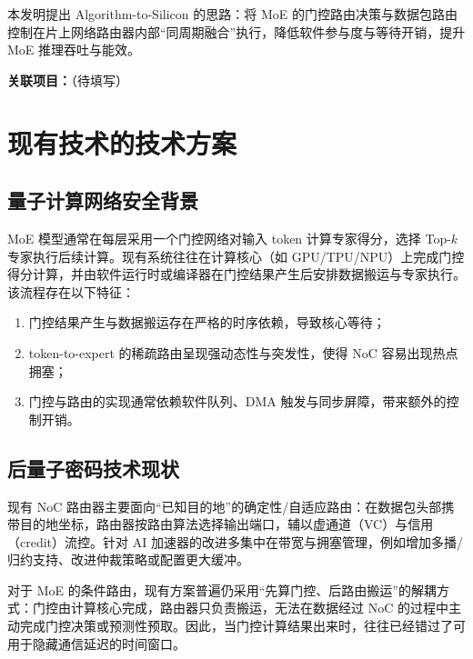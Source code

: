 \documentclass[12pt,a4paper]{article}
\begin{document}
本发明提出 Algorithm-to-Silicon 的思路：将 MoE 的门控路由决策与数据包路由控制在片上网络路由器内部“同周期融合”执行，降低软件参与度与等待开销，提升 MoE 推理吞吐与能效。

\textbf{关联项目：}\underline{\hspace{8cm}}（待填写）

\section{现有技术的技术方案}

\subsection{量子计算网络安全背景}

MoE 模型通常在每层采用一个门控网络对输入 token 计算专家得分，选择 Top-$k$ 专家执行后续计算。现有系统往往在计算核心（如 GPU/TPU/NPU）上完成门控得分计算，并由软件运行时或编译器在门控结果产生后安排数据搬运与专家执行。该流程存在以下特征：
\begin{enumerate}
    \item 门控结果产生与数据搬运存在严格的时序依赖，导致核心等待；
    \item token-to-expert 的稀疏路由呈现强动态性与突发性，使得 NoC 容易出现热点拥塞；
    \item 门控与路由的实现通常依赖软件队列、DMA 触发与同步屏障，带来额外的控制开销。
\end{enumerate}

\subsection{后量子密码技术现状}

现有 NoC 路由器主要面向“已知目的地”的确定性/自适应路由：在数据包头部携带目的地坐标，路由器按路由算法选择输出端口，辅以虚通道（VC）与信用（credit）流控。针对 AI 加速器的改进多集中在带宽与拥塞管理，例如增加多播/归约支持、改进仲裁策略或配置更大缓冲。

对于 MoE 的条件路由，现有方案普遍仍采用“先算门控、后路由搬运”的解耦方式：门控由计算核心完成，路由器只负责搬运，无法在数据经过 NoC 的过程中主动完成门控决策或预测性预取。因此，当门控计算结果出来时，往往已经错过了可用于隐藏通信延迟的时间窗口。

\end{document}
